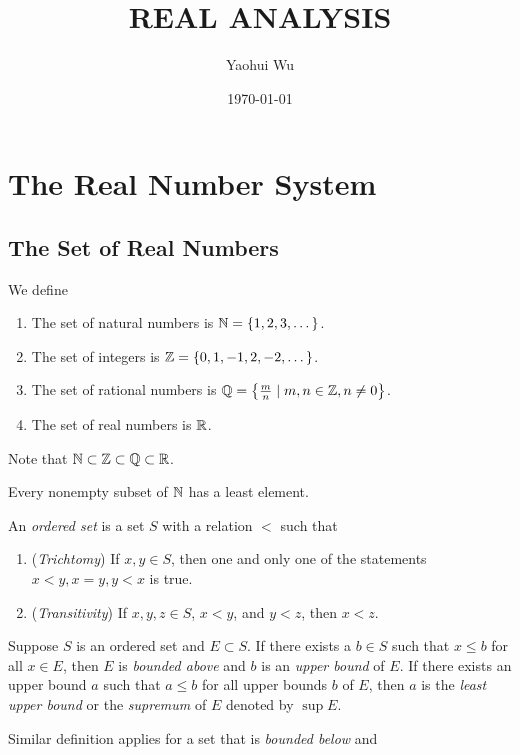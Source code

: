 \documentclass[12pt]{article}
\title{REAL ANALYSIS}
\author{Yaohui Wu}
\date{\today}
\begin{document}
\maketitle

\section{The Real Number System}
\subsection{The Set of Real Numbers}
We define
\begin{enumerate}
    \item The set of natural numbers is \(\mathbb{N}=\{1,2,3,\dots\}\).
    \item The set of integers is \(\mathbb{Z}=\{0,1,-1,2,-2,\dots\}\).
    \item The set of rational numbers is
    \(\mathbb{Q}=\left\{\frac{m}{n}\mid m,n\in\mathbb{Z},n\neq0\right\}\).
    \item The set of real numbers is \(\mathbb{R}\).
\end{enumerate}
Note that \(\mathbb{N}\subset\mathbb{Z}\subset\mathbb{Q}\subset\mathbb{R}\).
\begin{definition}
    Every nonempty subset of \(\mathbb{N}\) has a least element.
\end{definition}
\begin{definition}
    An \textit{ordered set} is a set \(S\) with a relation \(<\) such that
    \begin{enumerate}
        \item (\textit{Trichtomy}) If \(x,y\in S\), then one and only one of
        the statements \(x<y,x=y,y<x\) is true.
        \item (\textit{Transitivity}) If \(x,y,z\in S\), \(x<y\), and \(y<z\),
        then \(x<z\).
    \end{enumerate}
\end{definition}
\begin{definition}
    Suppose \(S\) is an ordered set and \(E\subset S\).
    If there exists a \(b\in S\) such that \(x\leq b\) for all \(x\in E\),
    then \(E\) is \textit{bounded above} and \(b\) is an \textit{upper bound}
    of \(E\).
    If there exists an upper bound \(a\) such that \(a\leq b\) for all upper
    bounds \(b\) of \(E\), then \(a\) is the \textit{least upper bound} or the
    \textit{supremum} of \(E\) denoted by \(\sup E\).
\end{definition}
Similar definition applies for a set that is \textit{bounded below} and
\end{document}
